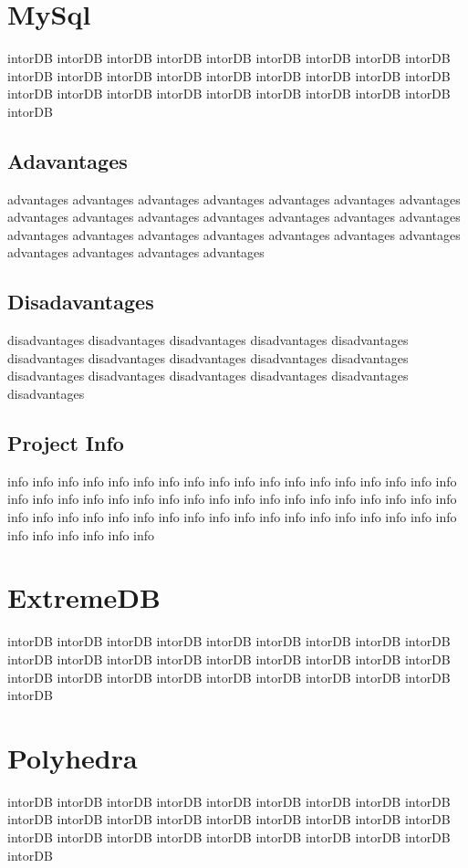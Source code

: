 		\section{MySql}
		intorDB intorDB intorDB intorDB intorDB intorDB intorDB 
		intorDB intorDB intorDB intorDB intorDB intorDB intorDB 
		intorDB intorDB intorDB intorDB intorDB intorDB intorDB 
		intorDB intorDB intorDB intorDB intorDB intorDB intorDB 
		
			\subsection{Adavantages}
			advantages advantages advantages advantages advantages 
			advantages advantages advantages advantages advantages 
			advantages advantages advantages advantages advantages 
			advantages advantages advantages advantages advantages 
			advantages advantages advantages advantages advantages 
			
			\subsection{Disadavantages}
			disadvantages disadvantages disadvantages disadvantages 
			disadvantages disadvantages disadvantages disadvantages 
			disadvantages disadvantages disadvantages disadvantages 
			disadvantages disadvantages disadvantages disadvantages 
			
			\subsection{Project Info}
			info info info info info info info info info info info info 
			info info info info info info info info info info info info 
			info info info info info info info info info info info info 
			info info info info info info info info info info info info 
			info info info info info info info info info info info info
		
		\section{ExtremeDB}
		intorDB intorDB intorDB intorDB intorDB intorDB intorDB 
		intorDB intorDB intorDB intorDB intorDB intorDB intorDB 
		intorDB intorDB intorDB intorDB intorDB intorDB intorDB 
		intorDB intorDB intorDB intorDB intorDB intorDB intorDB 
		
		\section{Polyhedra}
		intorDB intorDB intorDB intorDB intorDB intorDB intorDB 
		intorDB intorDB intorDB intorDB intorDB intorDB intorDB 
		intorDB intorDB intorDB intorDB intorDB intorDB intorDB 
		intorDB intorDB intorDB intorDB intorDB intorDB intorDB 
		
